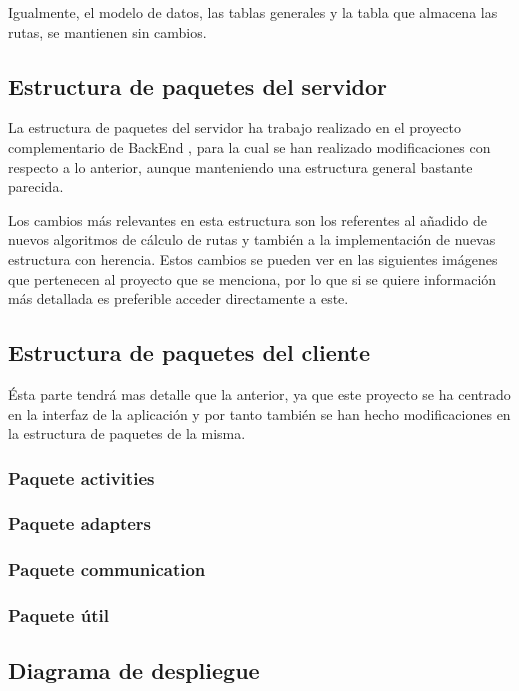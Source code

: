 Igualmente, el modelo de datos, las tablas generales y la tabla que almacena las rutas, se mantienen sin cambios.

\subsection{Estructura de paquetes del servidor}

La estructura de paquetes del servidor ha trabajo realizado en el proyecto complementario de BackEnd \cite{tfg2}, para la cual se han realizado modificaciones con respecto a lo anterior, aunque manteniendo una estructura general bastante parecida. 

Los cambios más relevantes en esta estructura son los referentes al añadido de nuevos algoritmos de cálculo de rutas y también a la implementación de nuevas estructura con herencia. Estos cambios se pueden ver en las siguientes imágenes que pertenecen al proyecto que se menciona, por lo que si se quiere información más detallada es preferible acceder directamente a este.

\subsection{Estructura de paquetes del cliente}

Ésta parte tendrá mas detalle que la anterior, ya que este proyecto se ha centrado en la interfaz de la aplicación y por tanto también se han hecho modificaciones en la estructura de paquetes de la misma.

\subsubsection{Paquete activities}

\subsubsection{Paquete adapters}

\subsubsection{Paquete communication}

\subsubsection{Paquete útil}

\subsection{Diagrama de despliegue}

